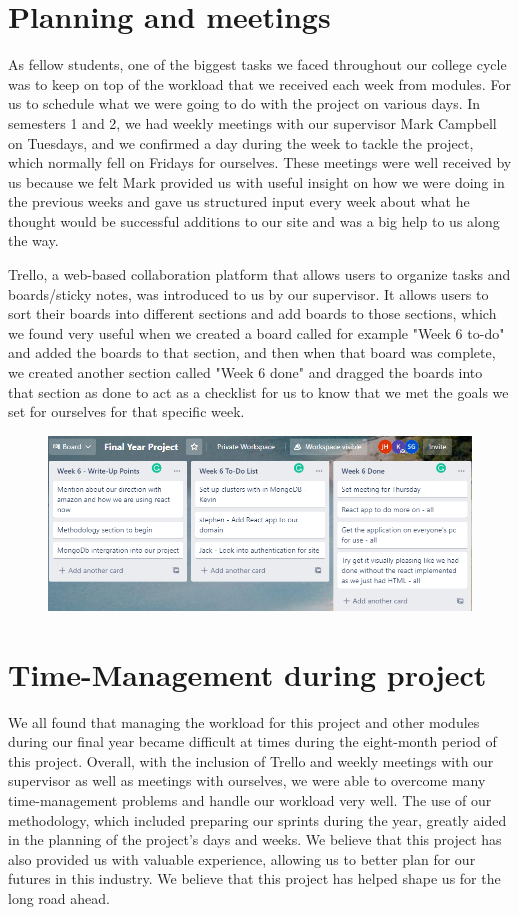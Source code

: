 \section{Planning and meetings }

As fellow students, one of the biggest tasks we faced throughout our college cycle was to keep on top of the workload that we received each week from modules. For us to schedule what we were going to do with the project on various days. In semesters 1 and 2, we had weekly meetings with our supervisor Mark Campbell on Tuesdays, and we confirmed a day during the week to tackle the project, which normally fell on Fridays for ourselves. These meetings were well received by us because we felt Mark provided us with useful insight on how we were doing in the previous weeks and gave us structured input every week about what he thought would be successful additions to our site and was a big help to us along the way.\hfill \break

Trello\cite{ref9}, a web-based collaboration platform that allows users to organize tasks and boards/sticky notes, was introduced to us by our supervisor. It allows users to sort their boards into different sections and add boards to those sections, which we found very useful when we created a board called for example "Week 6 to-do" and added the boards to that section, and then when that board was complete, we created another section called "Week 6 done" and dragged the boards into that section as done to act as a checklist for us to know that we met the goals we set for ourselves for that specific week.

\begin{figure}
    \centering
    \includegraphics[width=.4\textwidth]{images/88.png}
    \caption{  }
    \label{fig:my_label}
\end{figure}



\section{Time-Management during project }

We all found that managing the workload for this project and other modules during our final year became difficult at times during the eight-month period of this project. Overall, with the inclusion of Trello and weekly meetings with our supervisor as well as meetings with ourselves, we were able to overcome many time-management problems and handle our workload very well. The use of our methodology, which included preparing our sprints during the year, greatly aided in the planning of the project's days and weeks. We believe that this project has also provided us with valuable experience, allowing us to better plan for our futures in this industry. We believe that this project has helped shape us for the long road ahead.

